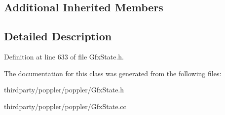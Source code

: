 \subsection*{Additional Inherited Members}


\subsection{Detailed Description}


Definition at line 633 of file Gfx\+State.\+h.



The documentation for this class was generated from the following files\+:\begin{DoxyCompactItemize}
\item 
thirdparty/poppler/poppler/Gfx\+State.\+h\item 
thirdparty/poppler/poppler/Gfx\+State.\+cc\end{DoxyCompactItemize}
